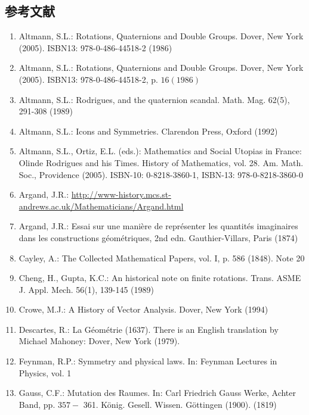 
\begin{CJK}{UTF8}{gkai}
  \chapter*{参考文献}
\end{CJK}
\begin{enumerate}
  \item Altmann, S.L.: Rotations, Quaternions and Double Groups. Dover, New York (2005). ISBN13: 978-0-486-44518-2 (1986)
  \item Altmann, S.L.: Rotations, Quaternions and Double Groups. Dover, New York (2005). ISBN13: 978-0-486-44518-2, p. $16(1986)$
  \item Altmann, S.L.: Rodrigues, and the quaternion scandal. Math. Mag. 62(5), 291-308 (1989)
  \item Altmann, S.L.: Icons and Symmetries. Clarendon Press, Oxford (1992)
  \item Altmann, S.L., Ortiz, E.L. (eds.): Mathematics and Social Utopias in France: Olinde Rodrigues and his Times. History of Mathematics, vol. 28. Am. Math. Soc., Providence (2005). ISBN-10: 0-8218-3860-1, ISBN-13: 978-0-8218-3860-0
  \item Argand, J.R.: \href{http://www-history.mcs.st-andrews.ac.uk/Mathematicians/Argand.html}{http://www-history.mcs.st-andrews.ac.uk/Mathematicians/Argand.html}
  \item Argand, J.R.: Essai sur une manière de représenter les quantités imaginaires dans les constructions géométriques, 2nd edn. Gauthier-Villars, Paris (1874)
  \item Cayley, A.: The Collected Mathematical Papers, vol. I, p. 586 (1848). Note 20
  \item Cheng, H., Gupta, K.C.: An historical note on finite rotations. Trans. ASME J. Appl. Mech. 56(1), 139-145 (1989)
  \item Crowe, M.J.: A History of Vector Analysis. Dover, New York (1994)

  \item Descartes, R.: La Géométrie (1637). There is an English translation by Michael Mahoney: Dover, New York (1979).

  \item Feynman, R.P.: Symmetry and physical laws. In: Feynman Lectures in Physics, vol. 1

  \item Gauss, C.F.: Mutation des Raumes. In: Carl Friedrich Gauss Werke, Achter Band, pp. $357-$ 361. König. Gesell. Wissen. Göttingen (1900). (1819)


\end{enumerate}
